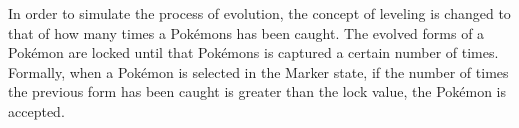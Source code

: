 \label{sec:evolution}

In order to simulate the process of evolution, the concept of leveling is changed to that of how many times a Pokémons has been caught. The evolved forms of a Pokémon are locked until that Pokémons is captured a certain number of times. Formally, when a Pokémon is selected in the Marker state, if the number of times the previous form has been caught is greater than the lock value, the Pokémon is accepted.